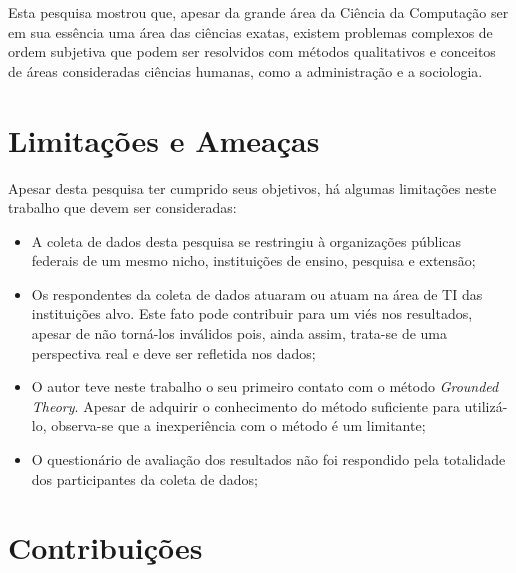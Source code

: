 Esta pesquisa mostrou que, apesar da grande área da Ciência da Computação ser em sua essência uma área das ciências exatas, existem problemas complexos de ordem subjetiva que podem ser resolvidos com métodos qualitativos e conceitos de áreas consideradas ciências humanas, como a administração e a sociologia.



\section{Limitações e Ameaças}

Apesar desta pesquisa ter cumprido seus objetivos, há algumas limitações neste trabalho que devem ser consideradas:
\begin{itemize}
\item A coleta de dados desta pesquisa se restringiu à organizações públicas federais de um mesmo nicho, instituições de ensino, pesquisa e extensão;
\item Os respondentes da coleta de dados atuaram ou atuam na área de TI das instituições alvo. Este fato pode contribuir para um viés nos resultados, apesar de não torná-los inválidos pois, ainda assim, trata-se de uma perspectiva real e deve ser refletida nos dados;
\item O autor teve neste trabalho o seu primeiro contato com o método \textit{Grounded Theory}. Apesar de adquirir o conhecimento do método suficiente para utilizá-lo, observa-se que a inexperiência com o método é um limitante;
\item O questionário de avaliação dos resultados não foi respondido pela totalidade dos participantes da coleta de dados;
\end{itemize}

\section{Contribuições}

